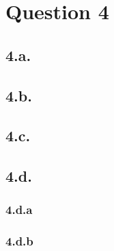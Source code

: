 \documentclass[12pt]{article}
\begin{document}
\section{Question 4}

\subsection{4.a.}
\subsection{4.b.}
\subsection{4.c.}
\subsection{4.d.}
\subsubsection{4.d.a}
\subsubsection{4.d.b}

%
% 
% 
\end{document}
